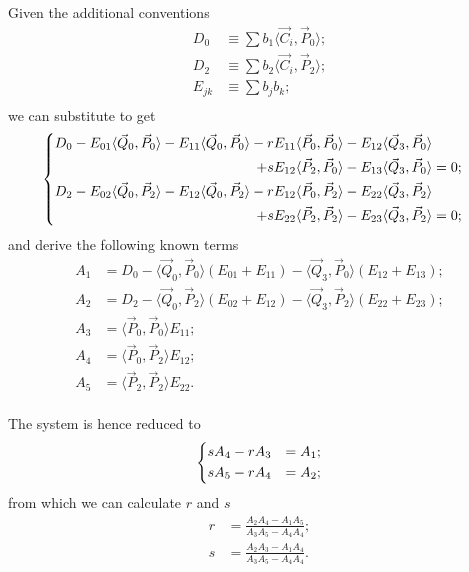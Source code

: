\documentclass{scrartcl}
\newcommand\V[1]{\vec{#1}}
\newcommand\SP[2]{\langle #1, #2 \rangle}
\begin{document}
Given the additional conventions
\begin{equation}\label{eq:DE}
\begin{split}
    D_0 &\equiv \sum b_1 \SP{\V{C}_i}{\V{P}_0}; \\
    D_2 &\equiv \sum b_2 \SP{\V{C}_i}{\V{P}_2}; \\
    E_{jk} &\equiv \sum b_j b_k; \\
\end{split}
\end{equation}
we can substitute to get
\begin{equation*}
\begin{dcases}
\begin{split}
    D_0 - E_{01}   \SP{\V{Q}_0}{\V{P}_0} -
	  E_{11}   \SP{\V{Q}_0}{\V{P}_0} -
	  r E_{11} \SP{\V{P}_0}{\V{P}_0} -
	  E_{12}   \SP{\V{Q}_3}{\V{P}_0} \\ +
	  s E_{12} \SP{\V{P}_2}{\V{P}_0} -
	  E_{13}   \SP{\V{Q}_3}{\V{P}_0} &= 0;
\end{split} \\
\begin{split}
    D_2 - E_{02}   \SP{\V{Q}_0}{\V{P}_2} -
	  E_{12}   \SP{\V{Q}_0}{\V{P}_2} -
	  r E_{12} \SP{\V{P}_0}{\V{P}_2} -
	  E_{22}   \SP{\V{Q}_3}{\V{P}_2} \\ +
	  s E_{22} \SP{\V{P}_2}{\V{P}_2} -
	  E_{23}   \SP{\V{Q}_3}{\V{P}_2} &= 0;
\end{split} \\
\end{dcases}
\end{equation*}
and derive the following known terms
\begin{equation}\label{eq:ACD}
\begin{split}
A_1 &= D_0 -
    \SP{\V{Q}_0}{\V{P}_0} (E_{01} + E_{11}) -
    \SP{\V{Q}_3}{\V{P}_0} (E_{12} + E_{13}); \\
A_2 &= D_2 -
    \SP{\V{Q}_0}{\V{P}_2} (E_{02} + E_{12}) -
    \SP{\V{Q}_3}{\V{P}_2} (E_{22} + E_{23}); \\
A_3 &= \SP{\V{P}_0}{\V{P}_0} E_{11}; \\
A_4 &= \SP{\V{P}_0}{\V{P}_2} E_{12}; \\
A_5 &= \SP{\V{P}_2}{\V{P}_2} E_{22}. \\
\end{split}
\end{equation}

The system is hence reduced to
\begin{equation*}
\begin{dcases}
    s A_4 - r A_3 &= A_1; \\
    s A_5 - r A_4 &= A_2; \\
\end{dcases}
\end{equation*}
from which we can calculate $r$ and $s$
\begin{equation}\label{eq:rs}
\begin{split}
    r &= \frac{A_2 A_4 - A_1 A_5}{A_3 A_5 - A_4 A_4}; \\
    s &= \frac{A_2 A_3 - A_1 A_4}{A_3 A_5 - A_4 A_4}. \\
\end{split}
\end{equation}
\end{document}

